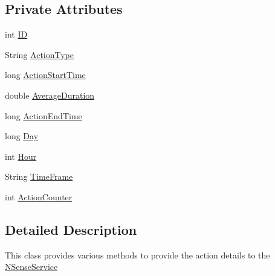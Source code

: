 \subsection*{Private Attributes}
\begin{DoxyCompactItemize}
\item 
int \hyperlink{classcs_1_1nsense_1_1accelerometer_1_1_actions_entry_a8a7c463483983a47bf0ab7407baa9711}{I\-D}
\item 
String \hyperlink{classcs_1_1nsense_1_1accelerometer_1_1_actions_entry_abcf8bc0a258a2a58c5039cf467e1e65b}{Action\-Type}
\item 
long \hyperlink{classcs_1_1nsense_1_1accelerometer_1_1_actions_entry_abeef24315d46a17b5cf9b6416e6d03a3}{Action\-Start\-Time}
\item 
double \hyperlink{classcs_1_1nsense_1_1accelerometer_1_1_actions_entry_a5f97f17d6fc01e680629f9f8b3c248c3}{Average\-Duration}
\item 
long \hyperlink{classcs_1_1nsense_1_1accelerometer_1_1_actions_entry_a578b1fdb8588b46f4da203247638cbff}{Action\-End\-Time}
\item 
long \hyperlink{classcs_1_1nsense_1_1accelerometer_1_1_actions_entry_adfa993675bbd906a553f20a2d7fbf343}{Day}
\item 
int \hyperlink{classcs_1_1nsense_1_1accelerometer_1_1_actions_entry_afdd99fa1e75722c47c82d413f87c1cad}{Hour}
\item 
String \hyperlink{classcs_1_1nsense_1_1accelerometer_1_1_actions_entry_af85930ad7355ea86af26adb607dd06d6}{Time\-Frame}
\item 
int \hyperlink{classcs_1_1nsense_1_1accelerometer_1_1_actions_entry_a3aeb26da154427ad502786f25b343cc5}{Action\-Counter}
\end{DoxyCompactItemize}


\subsection{Detailed Description}
This class provides various methods to provide the action details to the \hyperlink{classcs_1_1nsense_1_1_n_sense_service}{N\-Sense\-Service} 

